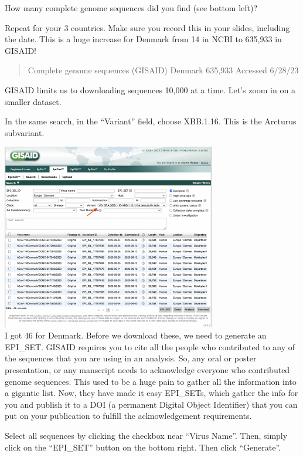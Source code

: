 \documentclass[
]{book}
\begin{document}
How many complete genome sequences did you find (see bottom left)?

Repeat for your 3 countries. Make sure you record this in your slides, including the date. This is a huge increase for Denmark from 14 in NCBI to 635,933 in GISAID!

\begin{quote}
Complete genome sequences (GISAID)
Denmark 635,933
Accessed 6/28/23
\end{quote}

GISAID limits us to downloading sequences 10,000 at a time. Let's zoom in on a smaller dataset.

In the same search, in the ``Variant'' field, choose XBB.1.16. This is the Arcturus subvariant.

\includegraphics[width=0.7\textwidth,height=\textheight]{./Figures/gisaidSearch.png}\\
I got 46 for Denmark. Before we download these, we need to generate an EPI\_SET. GISAID requires you to cite all the people who contributed to any of the sequences that you are using in an analysis. So, any oral or poster presentation, or any manscript needs to acknowledge everyone who contributed genome sequences. This used to be a huge pain to gather all the information into a gigantic list. Now, they have made it easy EPI\_SETs, which gather the info for you and publish it to a DOI (a permanent Digital Object Identifier) that you can put on your publication to fulfill the acknowledgement requirements.

Select all sequences by clicking the checkbox near ``Virus Name''. Then, simply click on the ``EPI\_SET'' button on the bottom right. Then click ``Generate''.
\end{document}
